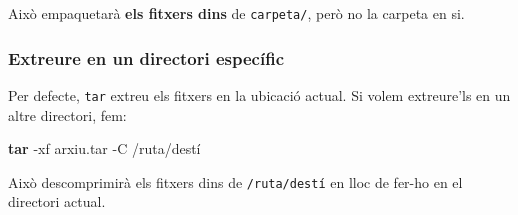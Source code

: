 \documentclass[
  12 pt,
  a4paper,
]{article}
\newenvironment{Shaded}{\begin{snugshade}}{\end{snugshade}}
\newcommand{\AttributeTok}[1]{\textcolor[rgb]{0.13,0.29,0.53}{#1}}
\newcommand{\FunctionTok}[1]{\textcolor[rgb]{0.13,0.29,0.53}{\textbf{#1}}}
\newcommand{\NormalTok}[1]{#1}
\begin{document}
Això empaquetarà \textbf{els fitxers dins} de \texttt{carpeta/}, però no
la carpeta en si.

\subsubsection{Extreure en un directori
específic}\label{extreure-en-un-directori-especuxedfic}

Per defecte, \texttt{tar} extreu els fitxers en la ubicació actual. Si
volem extreure'ls en un altre directori, fem:

\begin{Shaded}
\begin{Highlighting}[]
\FunctionTok{tar} \AttributeTok{{-}xf}\NormalTok{ arxiu.tar }\AttributeTok{{-}C}\NormalTok{ /ruta/destí}
\end{Highlighting}
\end{Shaded}

Això descomprimirà els fitxers dins de \texttt{/ruta/destí} en lloc de
fer-ho en el directori actual.
\end{document}
